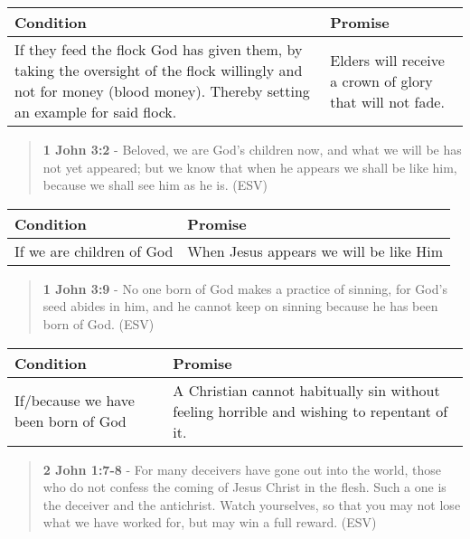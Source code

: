 \documentclass[11pt]{article}
\begin{document}
\begin{center}
\begin{tabular}{ll}
Condition & Promise\\[0pt]
\hline
If they feed the flock God has given them, by taking the oversight of the flock willingly and not for money (blood money). Thereby setting an example for said flock. & Elders will receive a crown of glory that will not fade.\\[0pt]
\end{tabular}
\end{center}

\begin{quote}
\textbf{1 John 3:2} - Beloved, we are God's children now, and what we will be has not yet appeared; but we know that when he appears we shall be like him, because we shall see him as he is. (ESV)
\end{quote}

\begin{center}
\begin{tabular}{ll}
Condition & Promise\\[0pt]
\hline
If we are children of God & When Jesus appears we will be like Him\\[0pt]
\end{tabular}
\end{center}

\begin{quote}
\textbf{1 John 3:9} - No one born of God makes a practice of sinning, for God's seed abides in him, and he cannot keep on sinning because he has been born of God. (ESV)
\end{quote}

\begin{center}
\begin{tabular}{ll}
Condition & Promise\\[0pt]
\hline
If/because we have been born of God & A Christian cannot habitually sin without feeling horrible and wishing to repentant of it.\\[0pt]
\end{tabular}
\end{center}

\begin{quote}
\textbf{2 John 1:7-8} - For many deceivers have gone out into the world, those who do not confess the coming of Jesus Christ in the flesh. Such a one is the deceiver and the antichrist. Watch yourselves, so that you may not lose what we have worked for, but may win a full reward. (ESV)
\end{quote}
\end{document}
